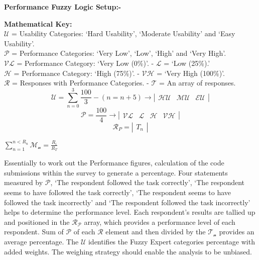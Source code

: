 \documentclass[a0,portrait]{a0poster}
\begin{document}
\begin{multicols}{2}

\textbf{Performance Fuzzy Logic Setup:-}
\begin{center}
    \textbf{Mathematical Key: }\\
    $\mathcal{U}$ = Usability Categories: `Hard Usability', `Moderate Usability' and `Easy Usability'.\\
    $\mathcal{P}$ = Performance Categories: `Very Low', `Low', `High' and `Very High'.\\
    $\mathcal{VL}$ = Performance Category: `Very Low (0\%)'. - $\mathcal{L}$ = `Low (25\%).'\\
    $\mathcal{H}$ = Performance Category: `High (75\%)'. - $\mathcal{VH}$ = `Very High (100\%)'.\\
    $\mathcal{R}$ = Responses with Performance Categories. - $\mathcal{T}$ = An array of responses.\\

    \[\mathcal{U} = \sum_{n = 0}^{3} \frac{100}{3} - (n = n + 5) \rightarrow \left|
        \begin{array}{ccc}
            \mathcal{HU} & \mathcal{MU} & \mathcal{EU}
        \end{array} \right|
    \]
    \[\mathcal{P} = \frac{100}{4} \rightarrow \left|
        \begin{array}{cccc}
            \mathcal{VL} & \mathcal{L} & \mathcal{H} & \mathcal{VH}
        \end{array} \right|
    \]
    \[ \mathcal{R}_{P} = \left| 
        \begin{array}{c}
            T_{n}
        \end{array}
        \right|
    \]

    $\sum_{n = 1}^{n < R_{n}} \mathcal{M_{n}} = \frac{R_{i}}{R_{T}}$
\end{center}
    
Essentially to work out the Performance figures, calculation of the code submissions within the survey to generate a percentage. Four statements measured by $\mathcal{P}$, `The respondent followed the task correctly', `The respondent seems to have followed the task correctly', `The respondent seems to have followed the task incorrectly' and `The respondent followed the task incorrectly' helps to determine the performance level. Each respondent's results are tallied up and positioned in the $\mathcal{R_{P}}$ array, which provides a performance level of each respondent. Sum of $\mathcal{P}$ of each $\mathcal{R}$ element and then divided by the $\mathcal{T_{n}}$ provides an average percentage. The $\mathcal{U}$ identifies the Fuzzy Expert categories percentage with added weights. The weighing strategy should enable the analysis to be unbiased.


\end{multicols}
\end{document}
